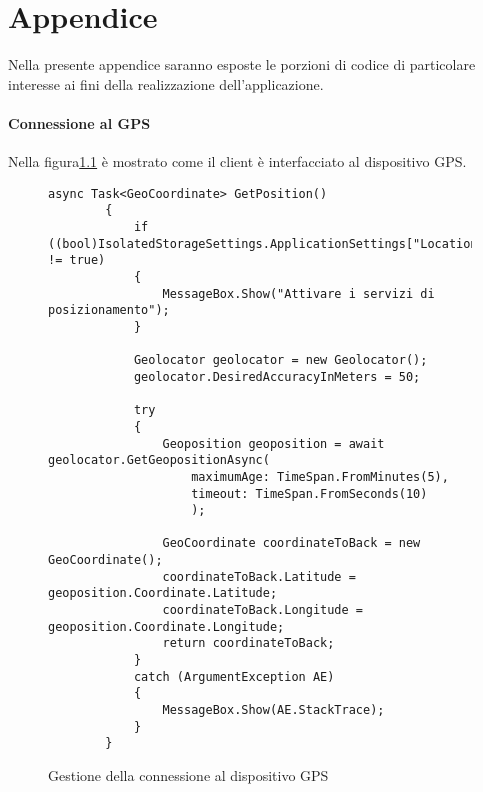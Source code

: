 
\chapter{Appendice}
\label{ref:appendice}


Nella presente appendice saranno esposte le porzioni di codice di particolare interesse ai fini della realizzazione dell'applicazione.
\subsubsection{Connessione al GPS}
Nella figura\ref{GPSConnection} è mostrato come il client è interfacciato al dispositivo GPS.
\begin{figure}
\begin{center}
\lstset{language=CSharp}
\begin{lstlisting}
async Task<GeoCoordinate> GetPosition()
        {
            if ((bool)IsolatedStorageSettings.ApplicationSettings["LocationConsent"] != true)
            {
                MessageBox.Show("Attivare i servizi di posizionamento");
            }

            Geolocator geolocator = new Geolocator();
            geolocator.DesiredAccuracyInMeters = 50;

            try
            {
                Geoposition geoposition = await geolocator.GetGeopositionAsync(
                    maximumAge: TimeSpan.FromMinutes(5),
                    timeout: TimeSpan.FromSeconds(10)
                    );

                GeoCoordinate coordinateToBack = new GeoCoordinate();
                coordinateToBack.Latitude = geoposition.Coordinate.Latitude;
                coordinateToBack.Longitude = geoposition.Coordinate.Longitude;
                return coordinateToBack;
            }
            catch (ArgumentException AE)
            {
                MessageBox.Show(AE.StackTrace);
            }
        }
\end{lstlisting}
\caption{Gestione della connessione al dispositivo GPS\label{GPSConnection}}
\end{center}
\end{figure}


\clearpage

\clearpage{\pagestyle{empty}\cleardoublepage}

